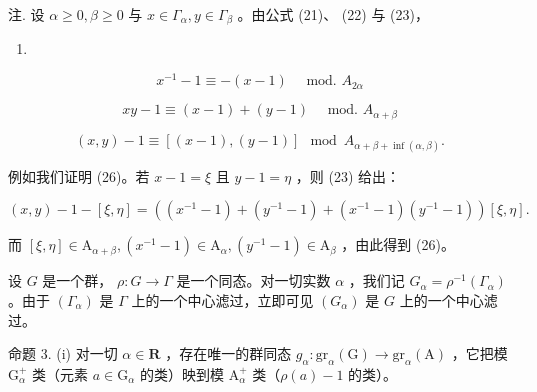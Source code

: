 注. 设 \(\alpha \geqslant 0, \beta \geqslant 0\) 与 \(x \in \Gamma_{\alpha}, y \in \Gamma_{\beta}\) 。由公式 (21)、 (22) 与 (23)，

\begin{enumerate}
\def\labelenumi{(\arabic{enumi})}
\setcounter{enumi}{23}
\tightlist
\item
\end{enumerate}

\[
x ^ {- 1} - 1 \equiv - (x - 1) \quad \text { mod. } A _ {2 \alpha}\tag{24}
\]

\[
x y - 1 \equiv (x - 1) + (y - 1) \quad \text { mod. } A _ {\alpha + \beta}\tag{25}
\]

\[
(x, y) - 1 \equiv [ (x - 1), (y - 1) ] \mod A _ {\alpha + \beta + \inf (\alpha , \beta)}.\tag{26}
\]

例如我们证明 (26)。若 \(x - 1 = \xi\) 且 \(y - 1 = \eta\) ，则 (23) 给出：

\[
(x, y) - 1 - [ \xi , \eta ] = ((x ^ {- 1} - 1) + (y ^ {- 1} - 1) + (x ^ {- 1} - 1) (y ^ {- 1} - 1)) [ \xi , \eta ].
\]

而 \([\xi, \eta] \in \mathrm{A}_{\alpha + \beta}, (x^{-1} - 1) \in \mathrm{A}_{\alpha}, (y^{-1} - 1) \in \mathrm{A}_{\beta}\) ，由此得到 (26)。

设 \(G\) 是一个群， \(\rho: G \to \Gamma\) 是一个同态。对一切实数 \(\alpha\) ，我们记 \(G_{\alpha} = \rho^{-1}(\Gamma_{\alpha})\) 。由于 \((\Gamma_{\alpha})\) 是 \(\Gamma\) 上的一个中心滤过，立即可见 \((G_{\alpha})\) 是 \(G\) 上的一个中心滤过。

命题 3. (i) 对一切 \(\alpha \in \mathbf{R}\) ，存在唯一的群同态 \(g_{\alpha} \colon \mathrm{gr}_{\alpha}(\mathrm{G}) \to \mathrm{gr}_{\alpha}(\mathrm{A})\) ，它把模 \(\mathrm{G}_{\alpha}^{+}\) 类（元素 \(a \in \mathrm{G}_{\alpha}\) 的类）映到模 \(\mathrm{A}_{\alpha}^{+}\) 类（\(\rho(a) - 1\) 的类）。

